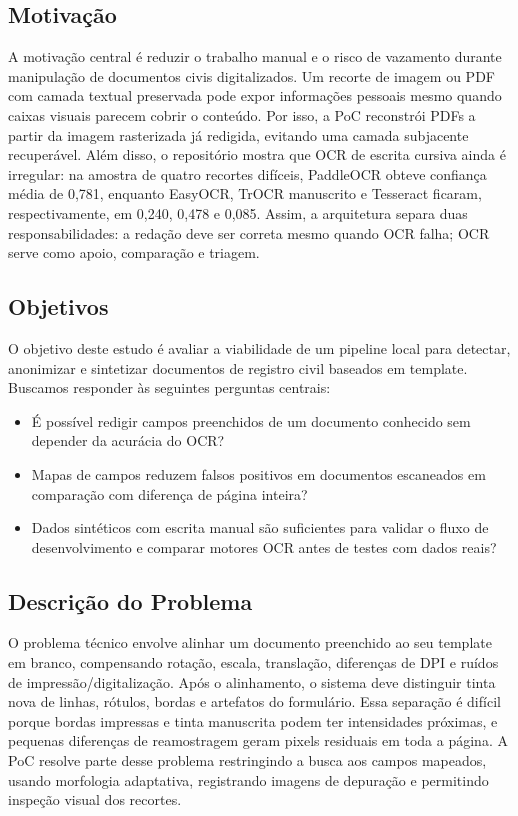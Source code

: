 \documentclass[12pt,a4paper]{article}
\begin{document}
\subsection{Motivação}

A motivação central é reduzir o trabalho manual e o risco de vazamento durante manipulação de documentos civis digitalizados. Um recorte de imagem ou PDF com camada textual preservada pode expor informações pessoais mesmo quando caixas visuais parecem cobrir o conteúdo. Por isso, a PoC reconstrói PDFs a partir da imagem rasterizada já redigida, evitando uma camada subjacente recuperável. Além disso, o repositório mostra que OCR de escrita cursiva ainda é irregular: na amostra de quatro recortes difíceis, PaddleOCR obteve confiança média de 0,781, enquanto EasyOCR, TrOCR manuscrito e Tesseract ficaram, respectivamente, em 0,240, 0,478 e 0,085. Assim, a arquitetura separa duas responsabilidades: a redação deve ser correta mesmo quando OCR falha; OCR serve como apoio, comparação e triagem.

\subsection{Objetivos}

O objetivo deste estudo é avaliar a viabilidade de um pipeline local para detectar, anonimizar e sintetizar documentos de registro civil baseados em template. Buscamos responder às seguintes perguntas centrais:

\begin{itemize}
    \item{} É possível redigir campos preenchidos de um documento conhecido sem depender da acurácia do OCR?
    \item{} Mapas de campos reduzem falsos positivos em documentos escaneados em comparação com diferença de página inteira?
    \item{} Dados sintéticos com escrita manual são suficientes para validar o fluxo de desenvolvimento e comparar motores OCR antes de testes com dados reais?
\end{itemize}

\subsection{Descrição do Problema}

O problema técnico envolve alinhar um documento preenchido ao seu template em branco, compensando rotação, escala, translação, diferenças de DPI e ruídos de impressão/digitalização. Após o alinhamento, o sistema deve distinguir tinta nova de linhas, rótulos, bordas e artefatos do formulário. Essa separação é difícil porque bordas impressas e tinta manuscrita podem ter intensidades próximas, e pequenas diferenças de reamostragem geram pixels residuais em toda a página. A PoC resolve parte desse problema restringindo a busca aos campos mapeados, usando morfologia adaptativa, registrando imagens de depuração e permitindo inspeção visual dos recortes.
\end{document}
